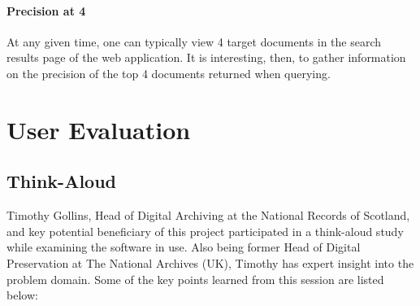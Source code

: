 \documentclass{l4proj}
\begin{document}
\paragraph{Precision at 4}
At any given time, one can typically view 4 target documents in the search results page of the web application. It is interesting, then, to gather information on the precision of the top 4 documents returned when querying.

\section{User Evaluation} \label{userevaluation}
\subsection{Think-Aloud}
Timothy Gollins, Head of Digital Archiving at the National Records of Scotland, and key potential beneficiary of this project participated in a think-aloud study while examining the software in use. Also being former Head of Digital Preservation at The National Archives (UK), Timothy has expert insight into the problem domain.
Some of the key points learned from this session are listed below:
\end{document}
